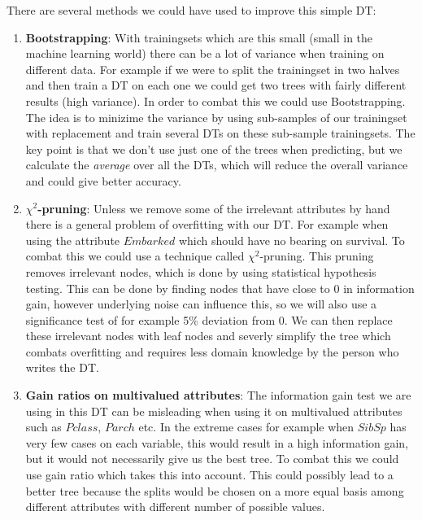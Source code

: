 \documentclass[11pt, english]{../Template/NTNUoving}
\begin{document}
\begin{oppgave}
\begin{punkt}
        There are several methods we could have used to improve this simple DT:
        \begin{enumerate}
            \item \textbf{Bootstrapping}: With trainingsets which are this small (small in the machine learning world) there can be a lot of variance when training on different data.
            For example if we were to split the trainingset in two halves and then train a DT on each one we could get two trees with fairly different results (high variance). In order to
            combat this we could use Bootstrapping\cite{ml}\cite{bootstrapping}. The idea is to minizime the variance by
            using sub-samples of our trainingset with replacement and train several DTs on these sub-sample trainingsets. The key point is that we don't use just one of the trees when predicting, but we calculate the
            \textit{average} over all the DTs, which will reduce the overall variance and could give better accuracy.
            \item \textbf{$\chi^2$-pruning}: Unless we remove some of the irrelevant attributes by hand there is a general problem of overfitting with our DT. For example when using the attribute $Embarked$ which should have no bearing
            on survival. To combat this we could use a technique called $\chi^2$-pruning. This pruning removes irrelevant nodes, which is done by using statistical hypothesis testing.
            This can be done by finding nodes that have close to 0 in information gain, however underlying noise can influence this, so we will also use a significance test of for example 5\% deviation from 0.
            We can then replace these irrelevant nodes with leaf nodes and severly simplify the tree which combats overfitting and requires less domain knowledge by the person who writes the DT.
            \item \textbf{Gain ratios on multivalued attributes}: The information gain test we are using in this DT can be misleading when using it on multivalued attributes such as $Pclass$, $Parch$ etc.
            In the extreme cases for example when $SibSp$ has very few cases on each variable, this would result in a high information gain, but it would not necessarily give us the best tree. To combat this we could
            use gain ratio \cite{gain} which takes this into account. This could possibly lead to a better tree because the splits would be chosen on a more equal basis among different
            attributes with different number of possible values.
        \end{enumerate}
    \end{punkt}
\end{oppgave}
\end{document}
